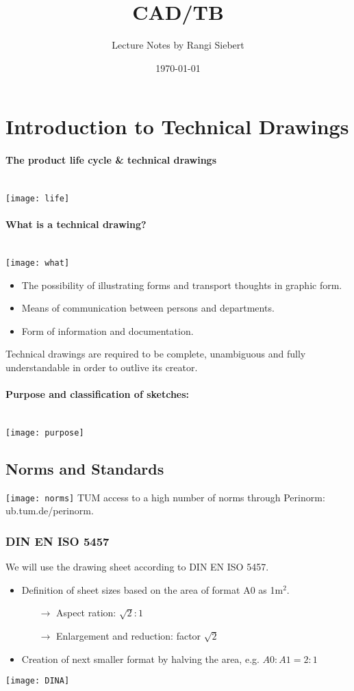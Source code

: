 \documentclass[twocolumn]{article}
\begin{document}
\title{CAD/TB}
\author{Lecture Notes by Rangi Siebert}
\date{\today}
\maketitle
\tableofcontents

\section{Introduction to Technical Drawings}
	\paragraph{The product life cycle \& technical drawings}\mbox{}\\
		\texttt{[image: life]}
	\paragraph{What is a technical drawing?}\mbox{}\\
		\texttt{[image: what]}
		\begin{itemize}
		\item The possibility of illustrating forms and transport thoughts in graphic form.
		\item Means of communication between persons and departments.
		\item Form of information and documentation.
		\end{itemize}
		Technical drawings are required to be complete, unambiguous and fully understandable in order to outlive its creator.
	\paragraph{Purpose and classification of sketches:}\mbox{}\\
		\texttt{[image: purpose]}
	\subsection{Norms and Standards}
		\texttt{[image: norms]}
		TUM access to a high number of norms through Perinorm: ub.tum.de/perinorm. 
		\subsubsection{DIN EN ISO 5457}
			We will use the drawing sheet according to DIN EN ISO 5457.
		\begin{itemize}
		\item Definition of sheet sizes based on the area of format A0 as 1m$^{2}$.
			\begin{itemize}
			\item[$\rightarrow$] Aspect ration: $\sqrt{2}:1$ 
			\item[$\rightarrow$] Enlargement and reduction: factor $\sqrt{2}$
			\end{itemize}
		\item Creation of next smaller format by halving the area, e.g. $A 0:A 1=2:1$
		\end{itemize}
		\texttt{[image: DINA]}
\end{document}
